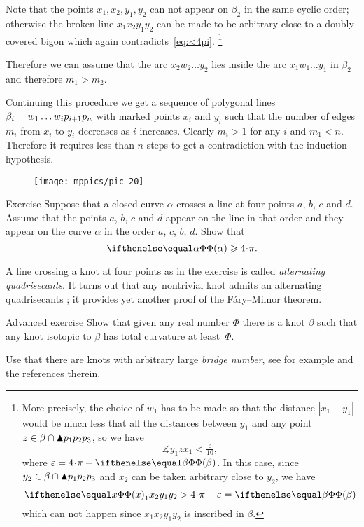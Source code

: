 Note that the points $x_1,x_2,y_1,y_2$ can not appear on $\beta_2$ in the same cyclic order;
otherwise the broken line $x_1x_2y_1y_2$ can be made to be arbitrary close to a doubly covered bigon which again contradicts~\ref{eq:<4pi}.%
\footnote{More precisely, the choice of $w_1$ has to be made so that the distance $|x_1-y_1|$ would be much less that all the distances between $y_1$ and any point $z\in\beta\cap \blacktriangle p_1p_2p_3$, so we have
\[\measuredangle y_1zx_1<\tfrac\varepsilon{10},\]
where $\varepsilon=4\cdot\pi-\tc\beta$.
In this case, since $y_2\in \beta\cap \blacktriangle p_1p_2p_3$ and $x_2$ can be taken arbitrary close to $y_2$, we have
\[\tc x_1x_2y_1y_2 > 4\cdot\pi -\varepsilon= \tc\beta\]
which can not happen since $x_1x_2y_1y_2$ is inscribed in $\beta$.}

Therefore we can assume that the arc $x_2w_2\dots y_2$ lies inside the arc $x_1w_1\dots y_1$ in $\beta_2$
and therefore $m_1>m_2$.

Continuing this procedure we get a sequence of polygonal lines $\beta_i\z=w_1\dots w_i p_{i+1}p_n$ with marked points $x_i$ and $y_i$ such that the number of edges $m_i$ from $x_i$ to $y_i$ decreases as $i$ increases.
Clearly $m_i>1$ for any $i$ and $m_1<n$.
Therefore it requires less than $n$ steps to get a contradiction with the induction hypothesis.
\qeds

\begin{wrapfigure}{r}{30 mm}
\vskip-0mm
\centering
\texttt{[image: mppics/pic-20]}
\vskip0mm
\end{wrapfigure}

\begin{thm}{Exercise}
Suppose that a closed curve $\alpha$ crosses a line at four points $a$, $b$, $c$ and $d$.
Assume that the points $a$, $b$, $c$ and $d$ appear on the line in that order and they appear on the curve $\alpha$ in the order $a$, $c$, $b$, $d$.
Show that 
\[\tc\alpha\ge 4\cdot\pi.\]
\end{thm}

A line crossing a knot at four points as in the exercise is called \emph{alternating quadrisecants}.
It turns out that any nontrivial knot admits an alternating quadrisecants \cite{denne};
it provides yet another proof of the F\'ary--Milnor theorem.


\begin{thm}{Advanced exercise}
Show that given any real number $\Phi$ there is a knot $\beta$ such that any knot isotopic to $\beta$ has total curvature at least~$\Phi$.   
\end{thm}

 Use that there are knots with arbitrary large \emph{bridge number}, see for example \cite{schultens} and the references therein.
